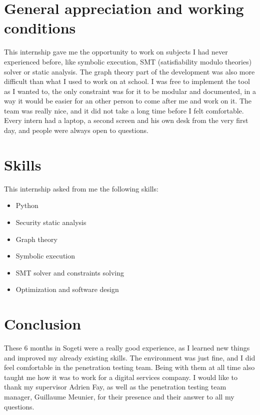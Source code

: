 \documentclass[a4paper, 12pt]{report}
\begin{document}
\section*{General appreciation and working conditions}
This internship gave me the opportunity to work on subjects I had never experienced before, like symbolic execution, SMT (satisfiability modulo theories) solver or
static analysis. The graph theory part of the development was also more difficult than what I used to work on at school.
I was free to implement the tool as I wanted to, the only constraint was for it to be modular and documented, in a way it would be
easier for an other person to come after me and work on it.
The team was really nice, and it did not take a long time before I felt comfortable. Every intern had a laptop, a second screen and
his own desk from the very first day, and people were always open to questions.
\section*{Skills}
This internship asked from me the following skills:
\begin{itemize}
        \item Python
        \item Security static analysis
        \item Graph theory
        \item Symbolic execution
        \item SMT solver and constraints solving
        \item Optimization and software design
\end{itemize}
\section*{Conclusion}
These 6 months in Sogeti were a really good experience, as I learned new things and improved my already existing skills. The environment
was just fine, and I did feel comfortable in the penetration testing team. Being with them at all time also taught me how it was to
work for a digital services company.
I would like to thank my supervisor Adrien Fay, as well as the penetration testing team manager, Guillaume Meunier, for their presence
and their answer to all my questions.
\end{document}
